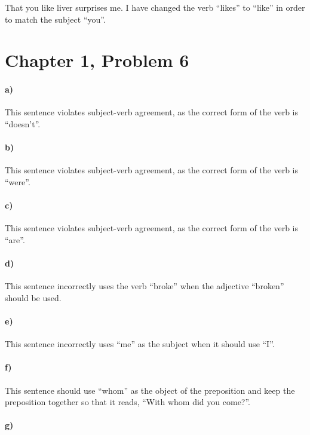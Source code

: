 \documentclass[12pt]{article}
\begin{document}
That you like liver surprises me. I have changed the verb ``likes'' to ``like'' in order to match the subject ``you''.

\section*{Chapter 1, Problem 6}

\paragraph{a)}

This sentence violates subject-verb agreement, as the correct form of the verb is ``doesn't''.

\paragraph{b)}

This sentence violates subject-verb agreement, as the correct form of the verb is ``were''.

\paragraph{c)}

This sentence violates subject-verb agreement, as the correct form of the verb is ``are''.

\paragraph{d)}

This sentence incorrectly uses the verb ``broke'' when the adjective ``broken'' should be used.

\paragraph{e)}

This sentence incorrectly uses ``me'' as the subject when it should use ``I''.

\paragraph{f)}

This sentence should use ``whom'' as the object of the preposition and keep the preposition together
so that it reads, ``With whom did you come?''.

\paragraph{g)}
\end{document}
